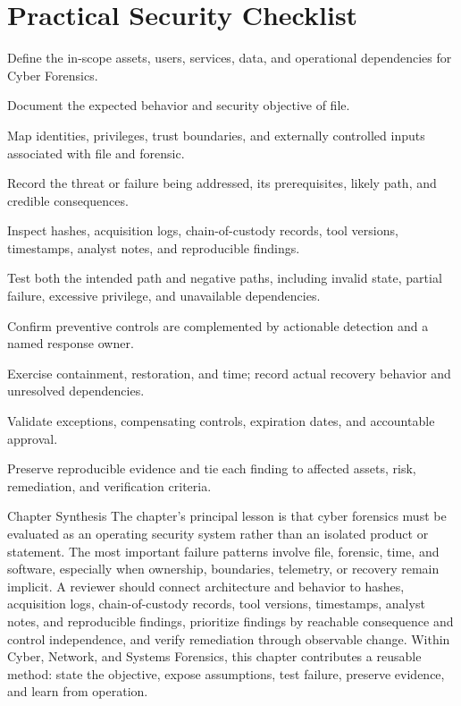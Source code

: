 \documentclass[11pt,letterpaper]{article}
\begin{document}
\section*{Practical Security Checklist}
\begin{CornellChecklist}
\item Define the in-scope assets, users, services, data, and operational dependencies for Cyber Forensics.
\item Document the expected behavior and security objective of file.
\item Map identities, privileges, trust boundaries, and externally controlled inputs associated with file and forensic.
\item Record the threat or failure being addressed, its prerequisites, likely path, and credible consequences.
\item Inspect hashes, acquisition logs, chain-of-custody records, tool versions, timestamps, analyst notes, and reproducible findings.
\item Test both the intended path and negative paths, including invalid state, partial failure, excessive privilege, and unavailable dependencies.
\item Confirm preventive controls are complemented by actionable detection and a named response owner.
\item Exercise containment, restoration, and time; record actual recovery behavior and unresolved dependencies.
\item Validate exceptions, compensating controls, expiration dates, and accountable approval.
\item Preserve reproducible evidence and tie each finding to affected assets, risk, remediation, and verification criteria.
\end{CornellChecklist}
\begin{CornellSummaryBox}{Chapter Synthesis}
The chapter's principal lesson is that cyber forensics must be evaluated as an operating security system rather than an isolated product or statement. The most important failure patterns involve file, forensic, time, and software, especially when ownership, boundaries, telemetry, or recovery remain implicit. A reviewer should connect architecture and behavior to hashes, acquisition logs, chain-of-custody records, tool versions, timestamps, analyst notes, and reproducible findings, prioritize findings by reachable consequence and control independence, and verify remediation through observable change. Within Cyber, Network, and Systems Forensics, this chapter contributes a reusable method: state the objective, expose assumptions, test failure, preserve evidence, and learn from operation.
\end{CornellSummaryBox}
\end{document}
